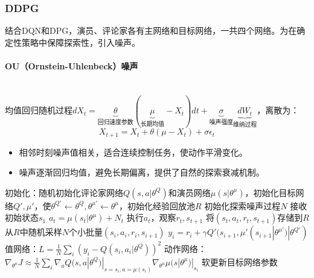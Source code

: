 \documentclass[
12pt, %
a4paper, 
oneside, %
headinclude,footinclude, %
]{scrartcl}
\begin{document}
\subsubsection[DDPG]{DDPG}
结合DQN和DPG，演员、评论家各有主网络和目标网络，一共四个网络。为在确定性策略中保障探索性，引入噪声。
\paragraph{OU（Ornstein-Uhlenbeck）噪声}~\\

均值回归随机过程$ dX_t = \underbrace{\theta}_{\text{回归速度参数}}(\underbrace{\mu}_{\text{长期均值}} - X_t)dt + \underbrace{\sigma}_{\text{噪声强度}} \underbrace{dW_t}_{\text{维纳过程}} $，离散为：
$$ X_{t + 1} = X_t + \theta(\mu - X_t) + \sigma \epsilon_t $$
\begin{itemize}
\item 相邻时刻噪声值相关，适合连续控制任务，使动作平滑变化。
\item 噪声逐渐回归均值，避免长期偏离，提供了自然的探索衰减机制。
\end{itemize}
\begin{myalgorithm}[DDPG]
\State 初始化：随机初始化评论家网络$ Q(s, a|\theta^Q) $和演员网络$ \mu(s|\theta^\mu) $，初始化目标网络$ Q', \mu' $，使$ \theta^{Q'} \gets \theta^Q, \theta^{\mu'} \gets \theta^\mu $，初始化经验回放池$ R $
\State 初始化探索噪声过程$ N $
\State 接收初始状态$ s_1 $
\State $ a_t = \mu(s_t|\theta^\mu) + N_t $ 
\State 执行$ a_t $，观察$ r_t, s_{t + 1} $
\State 将$ (s_t, a_t, r_t, s_{t + 1}) $存储到$ R $ 
\State 从$ R $中随机采样$ N $个小批量$ (s_i, a_i, r_i, s_{i + 1}) $
\State $ y_i = r_i + \gamma Q'(s_{i + 1}, \mu'(s_{i + 1}|\theta^{\mu'})|\theta^{Q'}) $ 
\State 值网络：$ L = \frac{1}{N}\sum_i (y_i - Q(s_i, a_i|\theta^Q))^2 $ 
\State 动作网络：$\nabla_{\theta^\mu} J \approx \frac{1}{N} \sum_i \nabla_a Q(s, a|\theta^Q)|_{s = s_i, a = \mu(s_i)} \nabla_{\theta^\mu} \mu(s|\theta^\mu)|_{s_i} $ 
\State 软更新目标网络参数
\EndFor
\EndFor
\end{myalgorithm}
\end{document}
